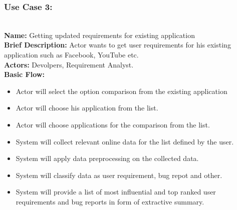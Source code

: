 \subsubsection {Use Case 3:}

\textbf {\\ Name:} Getting updated requirements for existing application\\
\textbf{Brief Description:} Actor wants to get user requirements for his existing application such as Facebook, YouTube etc.\\
\textbf{Actors: } Devolpers, Requirement Analyst.\\
\textbf{Basic Flow:}
\begin {itemize}
\item{Actor will select the option comparison from the existing application}
\item{Actor will choose his application from the list.}
\item{Actor will choose applications for the comparison from the list.}
\item{System will collect relevant online data for the list defined by the user.}
\item{System will apply data preprocessing on the collected data.}
\item{System will classify data as user requirement, bug repot and other.}
\item{System will provide a list of most influential and top ranked user requirements and bug reports in form of extractive summary.}
\end{itemize}

